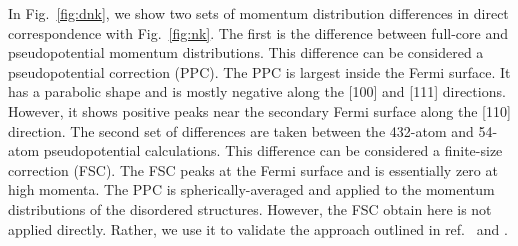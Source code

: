 \documentclass[aps,prb,showpacs,preprintnumbers,amsmath,amssymb,superscriptaddress,twocolumn]{revtex4-1}
\begin{document}
In Fig.~\ref{fig:dnk}, we show two sets of momentum distribution differences in direct correspondence with Fig.~\ref{fig:nk}. The first is the difference between full-core and pseudopotential momentum distributions. This difference can be considered a pseudopotential correction (PPC). The PPC is largest inside the Fermi surface. It has a parabolic shape and is mostly negative along the [100] and [111] directions. However, it shows positive peaks near the secondary Fermi surface along the [110] direction. The second set of differences are taken between the 432-atom and 54-atom pseudopotential calculations. This difference can be considered a finite-size correction (FSC). The FSC peaks at the Fermi surface and is essentially zero at high momenta. The PPC is spherically-averaged and applied to the momentum distributions of the disordered structures. However, the FSC obtain here is not applied directly. Rather, we use it to validate the approach outlined in ref.~\cite{Holzmann2009} and \cite{Holzmann2011}.
\end{document}

